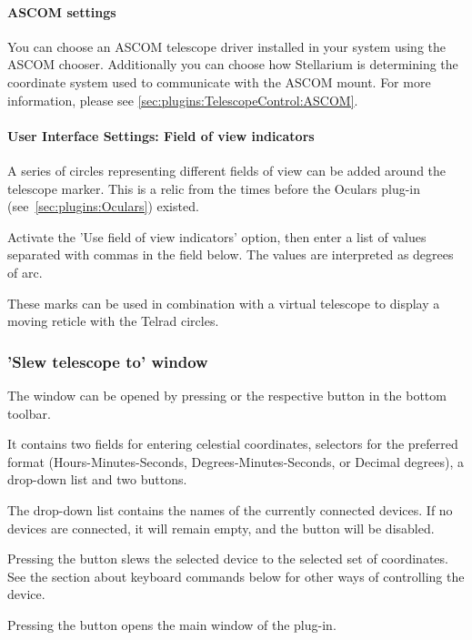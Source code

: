 \paragraph{ASCOM settings}
You can choose an ASCOM telescope driver installed in your system
using the ASCOM chooser. Additionally you can
choose how Stellarium is determining the coordinate system used to
communicate with the ASCOM mount. For more information, please see
\ref{sec:plugins:TelescopeControl:ASCOM}.

\paragraph{User Interface Settings: Field of view indicators}

A series of circles representing different fields of view can be added
around the telescope marker. This is a relic from the times before the
Oculars plug-in (see~\ref{sec:plugins:Oculars}) existed.

Activate the 'Use field of view indicators' option, then enter
a list of values separated with commas in the field below. The values
are interpreted as degrees of arc.

These marks can be used in combination with a virtual telescope to
display a moving reticle with the Telrad circles.


\subsubsection{'Slew telescope to' window}

The  window can be opened by pressing  or the respective button in the bottom toolbar.

It contains two fields for entering celestial coordinates, selectors
for the preferred format (Hours-Minutes-Seconds,
Degrees-Minutes-Seconds, or Decimal degrees), a drop-down list and two
buttons.

The drop-down list contains the names of the currently connected
devices. If no devices are connected, it will remain empty, and the
 button will be disabled.

Pressing the  button slews the selected device to the selected set
of coordinates. See the section about keyboard commands below for
other ways of controlling the device.

Pressing the  button opens the main window of
the plug-in.

